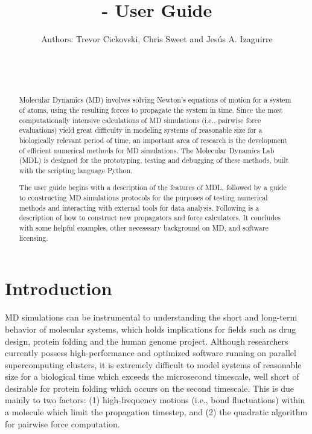 \documentclass[11pt]{report}
\author{
  \centerline{Authors: Trevor Cickovski, Chris Sweet and Jes\'{u}s A. Izaguirre}\\ \\ \\
}
\title{\MDL - User Guide}
\begin{document}
\maketitle
\tableofcontents


\begin{abstract}

Molecular Dynamics (MD) involves solving Newton's equations of motion
for a system of atoms, using the resulting forces to propagate the
system in time.  Since the most computationally intensive calculations
of MD simulations (i.e., pairwise force evaluations) yield great
difficulty in modeling systems of reasonable size for a biologically
relevant period of time, an important area of research
is the development of efficient numerical methods for MD simulations.  
The Molecular Dynamics Lab (MDL) is designed for the prototyping, testing 
and debugging of these methods, built with the scripting 
language Python.

The user guide begins with a description of the features of MDL,
followed by a guide to constructing MD simulations protocols for
the purposes of testing numerical methods and interacting with external
tools for data analysis.  Following is a description of how to construct
new propagators and force calculators.  It concludes with some helpful
examples, other necesssary background on MD, and software
licensing.

\end{abstract}


\chapter{Introduction}

MD simulations can be instrumental to understanding the short and
long-term behavior of molecular systems, which holds implications 
for fields such as drug design, protein folding and the human
genome project.  Although researchers currently possess 
high-performance and optimized software running on parallel 
supercomputing clusters, it is extremely difficult to model systems
of reasonable size for a biological time which exceeds the microsecond
timescale, well short of desirable for protein folding which
occurs on the second timescale.  This is due mainly to two factors:
(1) high-frequency motions (i.e., bond fluctuations) within a molecule
which limit the propagation timestep, and (2) the quadratic algorithm
for pairwise force computation.
\end{document}
